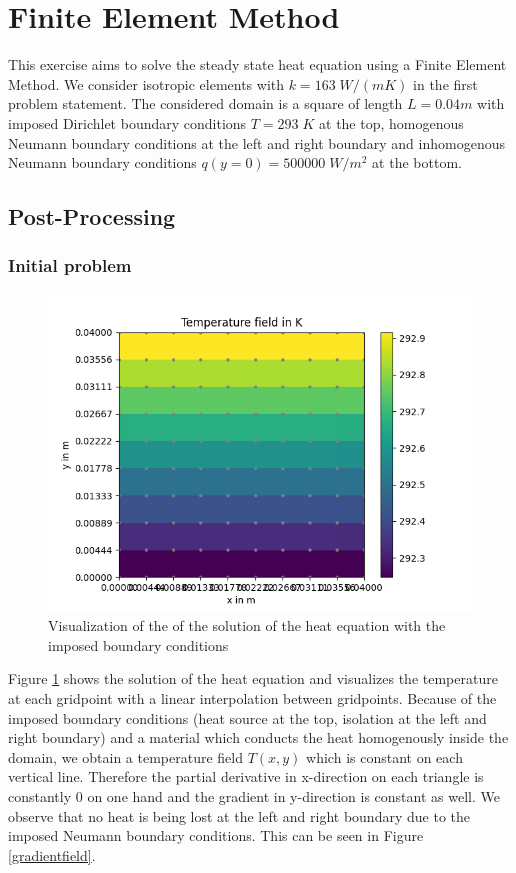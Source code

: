 \documentclass[a4paper,pt]{report}
\begin{document}
\section*{Finite Element Method}
This exercise aims to solve the steady state heat equation using a Finite Element Method.
We consider isotropic elements with $k = 163 \;W/(mK)$ in the first problem statement.
The considered domain is a square of length $L=0.04 m$ with imposed Dirichlet boundary conditions $T=293 \; K$ at the top, homogenous Neumann boundary conditions at the left and right boundary and inhomogenous Neumann boundary conditions $q(y=0)=500000 \; W/m^2$ at the bottom.

\subsection*{Post-Processing}
\subsubsection*{Initial problem}

\begin{figure}
	\centering
	\includegraphics[scale=0.6]{temperaturefield.png}
	\caption{Visualization of the of the solution of the heat equation with the imposed boundary conditions}
	\label{temperaturefield}
\end{figure} 

Figure \ref{temperaturefield} shows the solution of the heat equation and visualizes the temperature at each gridpoint with a linear interpolation between gridpoints. Because of the imposed boundary conditions (heat source at the top, isolation at the left and right boundary) and a material which conducts the heat homogenously inside the domain, we obtain a temperature field $T(x,y)$ which is constant on each vertical line. 
Therefore the partial derivative in x-direction on each triangle is constantly 0 on one hand and the gradient in y-direction is constant as  well. We observe that no heat is being lost at the left and right boundary due to the imposed Neumann boundary conditions. This can be seen in Figure \ref{gradientfield}. 
\end{document}
